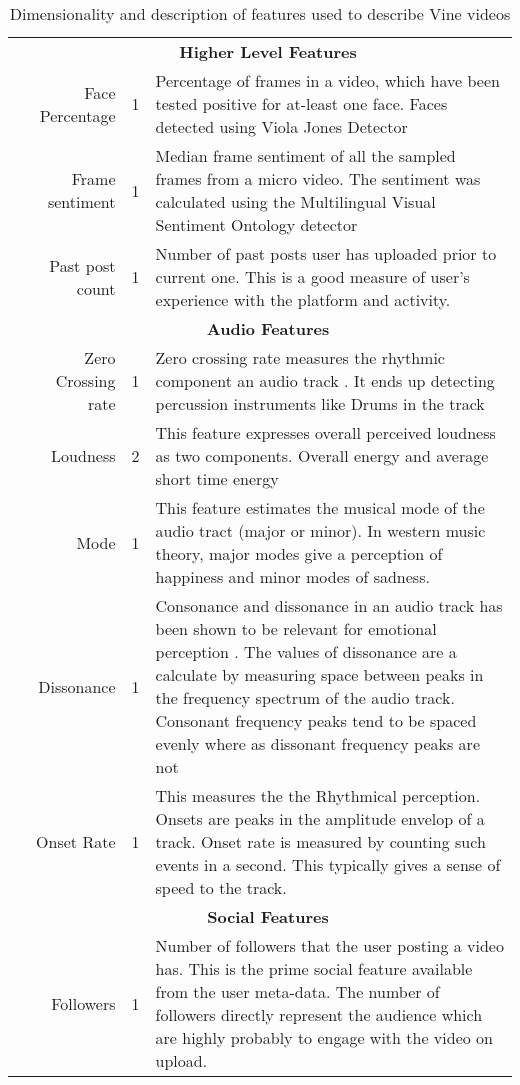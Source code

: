 \begin{appendix}
\begin{table}[hp]
{\begin{tabular}{|c|r|c|p{17cm}|}
	\cline{2-4}	
    &	\multicolumn{3}{c|}{\textbf{Higher Level Features}} \\
	\cline{2-4}
	 & Face Percentage & 1 & Percentage of frames in a video, which have been tested positive for at-least one face. Faces detected using Viola Jones Detector \cite{viola2004robust}\\
	 & Frame sentiment & 1 & Median frame sentiment of all the sampled frames from a micro video. The sentiment was calculated using the Multilingual Visual Sentiment 
	 Ontology detector \cite{jou2015visual} \\
	 & Past post count & 1 & Number of past posts user has uploaded prior to current one. This is a good measure of user's experience with the platform and activity.\\

	\cline{2-4}
    & \multicolumn{3}{c|}{\textbf{Audio Features}} \\
	\cline{2-4}
	& Zero Crossing rate & 1 & Zero crossing rate measures the rhythmic component an audio track \cite{laurier2009exploring}. It ends up detecting percussion instruments like Drums in the track\\
	& Loudness & 2 & This feature expresses overall perceived loudness as two components. Overall energy and average short time energy \cite{lartillot2007matlab}\\
	& Mode & 1 & This feature estimates the musical mode of the audio tract (major or minor). In western music theory, major modes give a perception of happiness and minor modes of sadness. \cite{laurier2009exploring} \\
	& Dissonance & 1 & Consonance and dissonance in an audio track has been shown to be relevant for emotional perception \cite{laurier2009exploring}. The values of dissonance are a calculate by measuring space between peaks in the frequency spectrum of the audio track. Consonant frequency peaks tend to be spaced evenly where as dissonant frequency peaks are not\\
	& Onset Rate & 1 & This measures the the Rhythmical perception. Onsets are peaks in the amplitude envelop of a track. Onset rate is measured by counting such events in a second. This typically gives a sense of speed to the track. \\
	\cline{2-4}
     &	\multicolumn{3}{c|}{\textbf{Social Features}} \\
	\cline{2-4}
	& Followers & 1 & Number of followers that the user posting a video has. This is the prime social feature available from the user meta-data. The number of followers directly represent the audience which are highly probably to engage with the video on upload.\\
	\hline
    \end{tabular}
    }
        \caption{Dimensionality and description of features used to describe Vine videos}
       \label{tab:Features_table}
\end{table}

\end{appendix}
